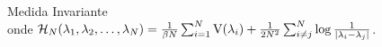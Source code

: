 \begin{frame}
\begin{minipage}[h][0.47\textheight][c]{\textwidth}
{\begin{block}{Medida Invariante}
\begin{equation*}
			\end{equation*}
				onde
				$\operatorname{\mathcal{H}}_N(\lambda_1, \lambda_2, \dots, \lambda_N) = \frac{1}{\beta N} \sum_{i=1}^N \operatorname{V}(\lambda_i) + \frac{1}{2N^2} \sum_{i \neq j}^{N}  \log \frac{1}{|\lambda_i - \lambda_j|}$.
		\end{block}
		}
	\end{minipage}
	
\end{frame}


